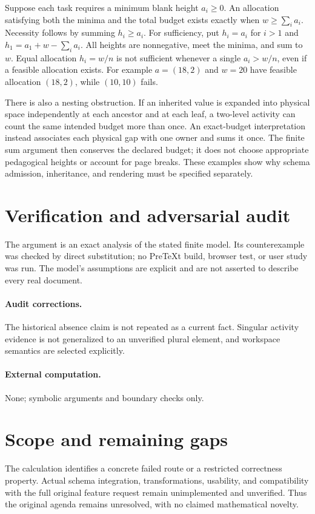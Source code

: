 \documentclass[11pt]{article}
\begin{document}
Suppose each task requires a minimum blank height $a_i\ge0$. An allocation satisfying both the minima and the total budget exists exactly when $w\ge\sum_i a_i$. Necessity follows by summing $h_i\ge a_i$. For sufficiency, put $h_i=a_i$ for $i>1$ and $h_1=a_1+w-\sum_i a_i$. All heights are nonnegative, meet the minima, and sum to $w$. Equal allocation $h_i=w/n$ is not sufficient whenever a single $a_i>w/n$, even if a feasible allocation exists. For example $a=(18,2)$ and $w=20$ have feasible allocation $(18,2)$, while $(10,10)$ fails.

There is also a nesting obstruction. If an inherited value is expanded into physical space independently at each ancestor and at each leaf, a two-level activity can count the same intended budget more than once. An exact-budget interpretation instead associates each physical gap with one owner and sums it once. The finite sum argument then conserves the declared budget; it does not choose appropriate pedagogical heights or account for page breaks. These examples show why schema admission, inheritance, and rendering must be specified separately.
\section{Verification and adversarial audit}
The argument is an exact analysis of the stated finite model. Its counterexample was checked by direct substitution; no PreTeXt build, browser test, or user study was run. The model's assumptions are explicit and are not asserted to describe every real document.
\paragraph{Audit corrections.} The historical absence claim is not repeated as a current fact. Singular activity evidence is not generalized to an unverified plural element, and workspace semantics are selected explicitly.
\paragraph{External computation.} None; symbolic arguments and boundary checks only.
\section{Scope and remaining gaps}
The calculation identifies a concrete failed route or a restricted correctness property. Actual schema integration, transformations, usability, and compatibility with the full original feature request remain unimplemented and unverified. Thus the original agenda remains unresolved, with no claimed mathematical novelty.
\end{document}
